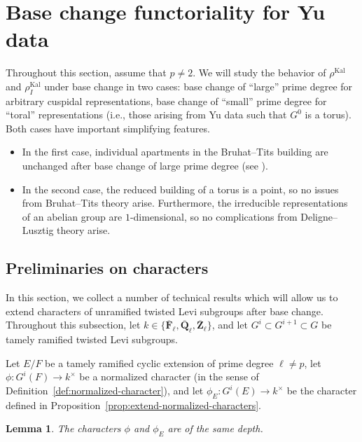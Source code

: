 \documentclass[reqno]{amsart}
\numberwithin{equation}{subsection}
\newcommand{\F}{\mathbf{F}}
\newcommand{\Q}{\mathbf{Q}}
\newcommand{\Z}{\mathbf{Z}}
\newcommand{\ol}[1]{\overline{#1}}
\newcommand{\co}{\colon}
\DeclareMathOperator{\Kal}{Kal}
\newtheorem{lemma}[thm]{Lemma}
\theoremstyle{remark}
\numberwithin{equation}{subsection}
\numberwithin{figure}{subsection}
\begin{document}
\section{Base change functoriality for Yu data}\label{sec:bc-functoriality-yu-data}

Throughout this section, assume that $p\neq 2$. We will study the behavior of $\rho^{\Kal}$ and $\rho_I^{\Kal}$ under base change in two cases: base change of ``large'' prime degree for arbitrary cuspidal representations, base change of ``small'' prime degree for ``toral'' representations (i.e., those arising from Yu data such that $G^0$ is a torus). Both cases have important simplifying features. 
\begin{itemize}
\item In the first case, individual apartments in the Bruhat--Tits building are unchanged after base change of large prime degree (see \cite[Proposition~4.1.2]{Cot26b}).
\item In the second case, the reduced building of a torus is a point, so no issues from Bruhat--Tits theory arise. Furthermore, the irreducible representations of an abelian group are $1$-dimensional, so no complications from Deligne--Lusztig theory arise.
\end{itemize} 

\subsection{Preliminaries on characters}\label{ss:technical-character-results}

In this section, we collect a number of technical results which will allow us to extend characters of unramified twisted Levi subgroups after base change. Throughout this subsection, let $k\in\{\ol\F_\ell,\ol\Q_\ell,\ol\Z_\ell\}$, and let $G^i \subset G^{i+1} \subset G$ be tamely ramified twisted Levi subgroups.

Let $E/F$ be a tamely ramified cyclic extension of prime degree $\ell\neq p$, let $\phi\co G^i(F) \to k^\times$ be a normalized character (in the sense of Definition~\ref{def:normalized-character}), and let $\phi_E\co G^i(E) \to k^\times$ be the character defined in Proposition~\ref{prop:extend-normalized-characters}.

\begin{lemma}\label{lemma:depth-stays-same}
The characters $\phi$ and $\phi_E$ are of the same depth.
\end{lemma}
\end{document}
